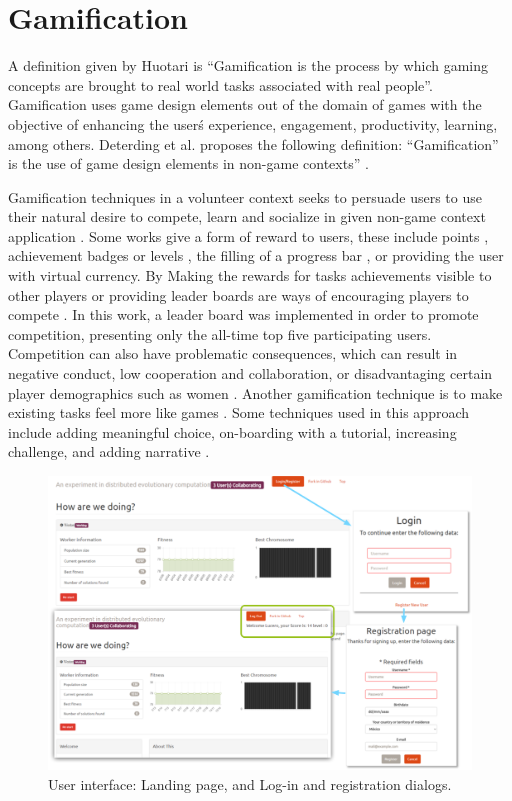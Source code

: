 \documentclass{llncs}
\begin{document}
\section{Gamification}
\label{sec:gamification}
A definition given by Huotari  \cite{huotari2012defining} is ``Gamification is
the process by which gaming concepts are brought to real world tasks associated with
real people''. Gamification uses game design elements out of the domain of games
with the objective of enhancing the user\'s experience, engagement, productivity,
learning, among others. Deterding et al. proposes the following definition:
 ``Gamification” is the use of game design elements in non-game contexts''
 \cite{deterding2011gamification}.

Gamification techniques in a volunteer context seeks to persuade
users to use their natural desire to compete, learn and socialize in
given non-game context application \cite{deterding2011game,hamari2014does}.
Some works give a form of reward to users, these include
points \cite{sutter2010browse}, achievement badges or levels \cite{hamari2011framework},
the filling of a progress bar \cite{o2010get}, or providing the user with virtual currency.
By Making the rewards for  tasks achievements visible to other players or
providing leader boards are ways of encouraging players to compete \cite{hickman2010total}. In this work, a leader board was implemented in order to promote competition, presenting only the all-time top five participating users. Competition can also have problematic consequences, which can result in
negative conduct, low cooperation and collaboration, or disadvantaging certain player demographics
such as women \cite{kumar2013gamification}. Another gamification technique
is to make existing tasks feel more like games \cite{deterding2010just}.
Some techniques used in this approach include adding meaningful choice,
on-boarding with a tutorial, increasing challenge, and adding narrative \cite{mcgonigal2011reality}.



\begin{figure}[htb]
    \centering
        \includegraphics[width=5in]{img/login.png}
    \caption{ User interface: Landing page, and Log-in and registration dialogs.
    }
    \label{fig:login}
\end{figure}
\end{document}
